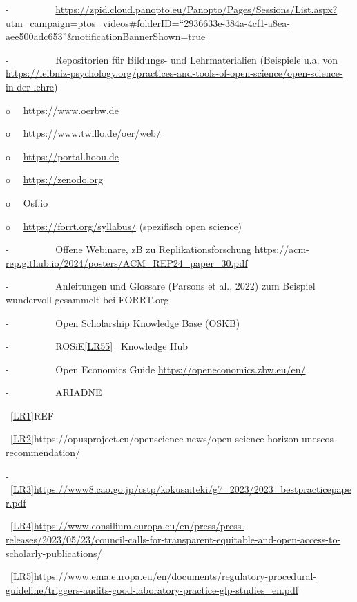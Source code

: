 \documentclass[
  letterpaper,
  DIV=11,
  numbers=noendperiod]{scrreprt}
\begin{document}
-~~~~~~~~~
\href{https://zpid.cloud.panopto.eu/Panopto/Pages/Sessions/List.aspx?utm_campaign=ptos_videos\#folderID=\%222936633e-384a-4cf1-a8ea-aee500adc653\%22&notificationBannerShown=true}{https://zpid.cloud.panopto.eu/Panopto/Pages/Sessions/List.aspx?utm\_campaign=ptos\_videos\#folderID=``2936633e-384a-4cf1-a8ea-aee500adc653''\&notificationBannerShown=true}

-~~~~~~~~~ Repositorien für Bildungs- und Lehrmaterialien (Beispiele
u.a. von
\url{https://leibniz-psychology.org/practices-and-tools-of-open-science/open-science-in-der-lehre})

o~~ \url{https://www.oerbw.de}

o~~ \url{https://www.twillo.de/oer/web/}

o~~ \url{https://portal.hoou.de}

o~~ \url{https://zenodo.org}

o~~ Osf.io

o~~ \url{https://forrt.org/syllabus/} (spezifisch open science)

-~~~~~~~~~ Offene Webinare, zB zu Replikationsforschung
\url{https://acm-rep.github.io/2024/posters/ACM_REP24_paper_30.pdf}

-~~~~~~~~~ Anleitungen und Glossare (Parsons et al., 2022) zum Beispiel
wundervoll gesammelt bei FORRT.org

-~~~~~~~~~ Open Scholarship Knowledge Base (OSKB)

-~~~~~~~~~ ROSiE\hyperref[_msocom_55]{{[}LR55{]}}~ Knowledge Hub

-~~~~~~~~~ Open Economics Guide \url{https://openeconomics.zbw.eu/en/}

-~~~~~~~~~ ARIADNE

~\hyperref[_msoanchor_1]{{[}LR1{]}}REF

~\hyperref[_msoanchor_2]{{[}LR2{]}}https://opusproject.eu/openscience-news/open-science-horizon-unescos-recommendation/

-~~~~~~~~~
~\hyperref[_msoanchor_3]{{[}LR3{]}}\url{https://www8.cao.go.jp/cstp/kokusaiteki/g7_2023/2023_bestpracticepaper.pdf}

~\hyperref[_msoanchor_4]{{[}LR4{]}}\url{https://www.consilium.europa.eu/en/press/press-releases/2023/05/23/council-calls-for-transparent-equitable-and-open-access-to-scholarly-publications/}

~\hyperref[_msoanchor_5]{{[}LR5{]}}\url{https://www.ema.europa.eu/en/documents/regulatory-procedural-guideline/triggers-audits-good-laboratory-practice-glp-studies_en.pdf}
\end{document}
